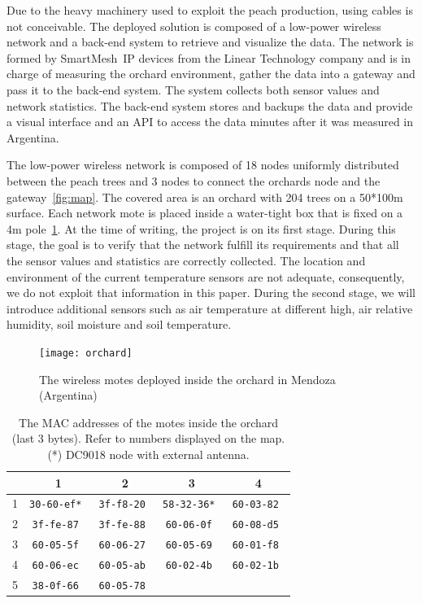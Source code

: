 \documentclass{sig-alternate}
\newcommand{\smip}                  {SmartMesh~IP\xspace}
\begin{document}

Due to the heavy machinery used to exploit the peach production, using cables is not conceivable.
The deployed solution is composed of a low-power wireless network and a back-end system to retrieve and visualize the data.
The network is formed by \smip devices from the Linear Technology company and is in charge of measuring the orchard environment, gather the data into a gateway and pass it to the back-end system.
The system collects both sensor values and network statistics.
The back-end system stores and backups the data and provide a visual interface and an API to access the data minutes after it was measured in Argentina.


The low-power wireless network is composed of 18 nodes uniformly distributed between the peach trees and 3 nodes to connect the orchards node and the gateway~\ref{fig:map}.
The covered area is an orchard with 204 trees on a 50*100m surface.
Each network mote is placed inside a water-tight box that is fixed on a 4m pole~\ref{fig:orchard}.
At the time of writing, the project is on its first stage.
During this stage, the goal is to verify that the network fulfill its requirements and that all the sensor values and statistics are correctly collected.
The location and environment of the current temperature sensors are not adequate, consequently, we do not exploit that information in this paper.
During the second stage, we will introduce additional sensors such as air temperature at different high, air relative humidity, soil moisture and soil temperature.

\begin{figure}
    \centering
    \texttt{[image: orchard]}
    \caption{The wireless motes deployed inside the orchard in Mendoza (Argentina)}
    \label{fig:orchard}
\end{figure}

\begin{table}
\begin{center}
    \begin{tabular}{ | c | c | c | c | c |}
         \hline
           & 1 & 2 & 3 & 4\\
         \hline
         1 & \tt{30-60-ef*} & \tt{3f-f8-20} & \tt{58-32-36*} & \tt{60-03-82} \\
         2 & \tt{3f-fe-87}  & \tt{3f-fe-88} & \tt{60-06-0f}  & \tt{60-08-d5} \\
         3 & \tt{60-05-5f}  & \tt{60-06-27} & \tt{60-05-69}  & \tt{60-01-f8} \\
         4 & \tt{60-06-ec}  & \tt{60-05-ab} & \tt{60-02-4b}  & \tt{60-02-1b} \\
         5 & \tt{38-0f-66}  & \tt{60-05-78} &                &               \\
         \hline
    \end{tabular}
    \caption{The MAC addresses of the motes inside the orchard (last 3 bytes). Refer to numbers displayed on the map. (*) DC9018 node with external antenna.}
\end{center}
\end{table}
\end{document}
